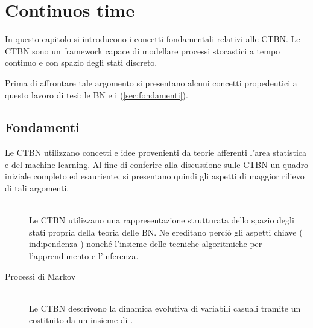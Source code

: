 
\chapter{Continuos time \bn{}}
\label{cap:ctbn}
\acresetall
In questo capitolo si introducono i concetti fondamentali relativi alle \ac{CTBN}. Le \acs{CTBN} sono un framework capace di modellare processi stocastici a tempo continuo e con spazio degli stati discreto.

Prima di affrontare tale argomento si presentano alcuni concetti propedeutici a questo lavoro di tesi: le \ac{BN} e i \mprocess{} (\autoref{sec:fondamenti}).
\section{Fondamenti}
\label{sec:fondamenti}
Le \acl{CTBN} utilizzano concetti e idee provenienti da teorie afferenti l'area statistica e del machine learning. Al fine di conferire alla discussione sulle \acs{CTBN} un quadro iniziale completo ed esauriente, si presentano quindi gli aspetti di maggior rilievo di tali argomenti.
\begin{description}
\item[\bn{}] \hfill \\
Le \acl{CTBN} utilizzano una rappresentazione strutturata dello spazio degli stati propria della teoria delle \acl{BN}. Ne ereditano perciò gli aspetti chiave (\eg{} indipendenza \cond*{}) nonché l'insieme delle tecniche algoritmiche per l'apprendimento e l'inferenza.
\item[Processi di Markov]\label{sec:fondamenti-mp}\hfill \\
Le \acl{CTBN} descrivono la dinamica evolutiva di variabili casuali tramite un \mprocess*{} \omog*{} costituito da un insieme di \mprocess{} \cond{}.
\end{description}

